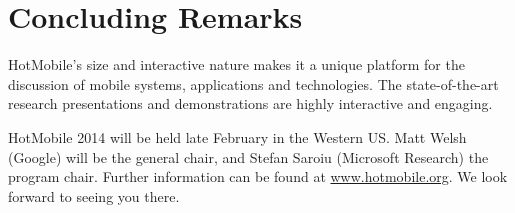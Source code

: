 \section{Concluding Remarks}
\label{sec:conclusion}
HotMobile's size and interactive nature makes it a unique platform for the
discussion of mobile systems, applications and technologies. The state-of-the-art 
research presentations and demonstrations are highly interactive and engaging.

HotMobile 2014 will be held late February in the Western US. Matt Welsh
(Google) will be the general chair, and Stefan Saroiu (Microsoft Research) the
program chair. Further information can be  found at \url{www.hotmobile.org}.
We look forward to seeing you there.
